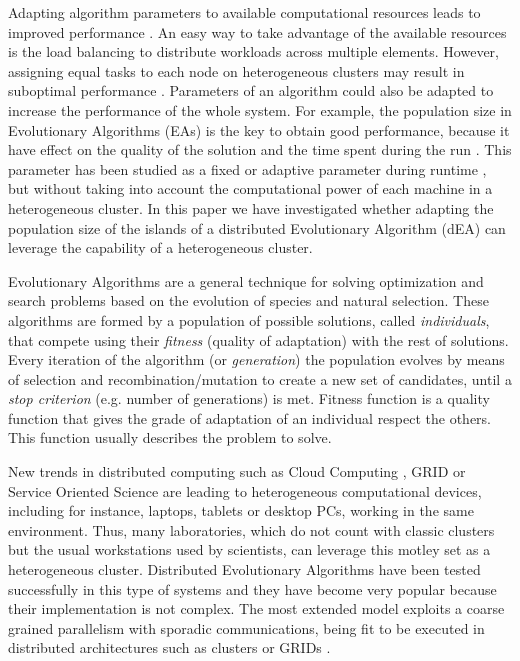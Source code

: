 \documentclass[final,1p,times]{elsarticle}
\begin{document}
Adapting algorithm parameters to available computational resources leads to improved performance \cite{AutomaticallyConfiguringStyles12}. An easy way to take advantage of the available resources is the load balancing \cite{PARALLELIMPLEMENTATION} to distribute workloads across multiple elements. However, assigning equal tasks  to each node on heterogeneous clusters may result in suboptimal performance \cite{LoadBalancingBohn02}. Parameters of an algorithm could also be adapted to increase the performance of the whole system. For example, the population size in Evolutionary Algorithms (EAs) is the key to obtain good performance, because it have effect on the quality of the solution and the time spent during the run \cite{ShrinkageLaredo09}. This parameter has been studied as a fixed \cite{SizingHarik99} or adaptive parameter during runtime \cite{AdaptiveLobo07,SelfRegulatedSizeFernandes06}, but without taking into account the computational power of each machine in a heterogeneous cluster. In this paper we have investigated whether adapting the population size of the islands of a distributed Evolutionary Algorithm (dEA) \cite{MULTIKULTI} can leverage the capability of a heterogeneous cluster.

Evolutionary Algorithms are a general technique for solving optimization and search problems based on the evolution of species and natural selection. These algorithms are formed by a population of possible solutions, called {\em individuals}, that compete using their {\em fitness} (quality of adaptation) with the rest of solutions. Every iteration of the algorithm (or {\em generation}) the population evolves by means of selection and recombination/mutation to create a new set of candidates, until a {\em stop criterion} (e.g. number of generations) is met. Fitness function is a quality function that gives the grade of adaptation of an individual respect the others. This function usually describes the problem to solve.

New trends in distributed computing such as Cloud Computing \cite{CLOUD}, GRID
\cite{OPENSCIENCEGRID} or Service Oriented Science \cite{GLOBUS} are
leading to heterogeneous computational devices, including for instance, laptops,
tablets or desktop PCs, working in the same
environment. Thus, many laboratories, which do not count with classic
clusters but the usual workstations used by scientists, can leverage
this motley set as a heterogeneous cluster. Distributed Evolutionary
Algorithms \cite{MULTIKULTI,PARALLELGRIDHETEROGENEOUS} have been tested successfully in this
type of systems \cite{HETEROGENEOUSHARD} and they have become very popular because their implementation is
not complex.
The most extended model exploits a coarse grained parallelism with sporadic
 communications, being fit to be executed in distributed architectures
 such as clusters or GRIDs \cite{PLATO}.
\end{document}
